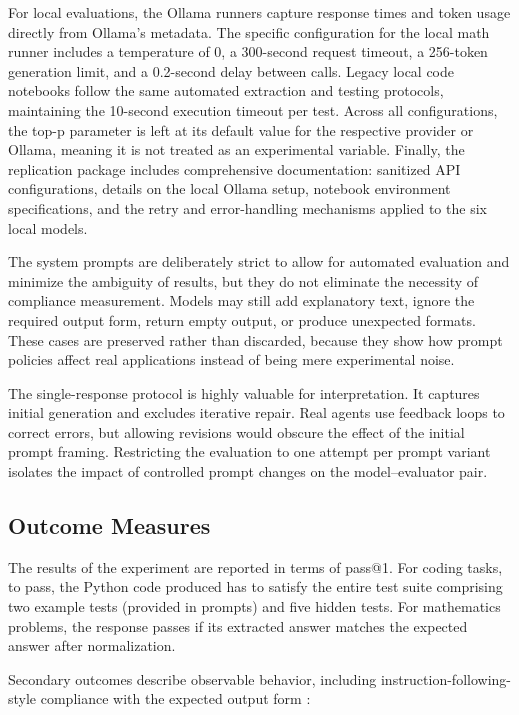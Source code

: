 \documentclass{llncs}
\begin{document}
For local evaluations, the Ollama runners capture response times and token usage directly from Ollama's metadata. The specific configuration for the local math runner includes a temperature of 0, a 300-second request timeout, a 256-token generation limit, and a 0.2-second delay between calls. Legacy local code notebooks follow the same automated extraction and testing protocols, maintaining the 10-second execution timeout per test. Across all configurations, the top-p parameter is left at its default value for the respective provider or Ollama, meaning it is not treated as an experimental variable. Finally, the replication package includes comprehensive documentation: sanitized API configurations, details on the local Ollama setup, notebook environment specifications, and the retry and error-handling mechanisms applied to the six local models.

The system prompts are deliberately strict to allow for automated evaluation and minimize the ambiguity of results, but they do not eliminate the necessity of compliance measurement. Models may still add explanatory text, ignore the required output form, return empty output, or produce unexpected formats. These cases are preserved rather than discarded, because they show how prompt policies affect real applications instead of being mere experimental noise.

The single-response protocol is highly valuable for interpretation. It captures initial generation and excludes iterative repair. Real agents use feedback loops to correct errors, but allowing revisions would obscure the effect of the initial prompt framing. Restricting the evaluation to one attempt per prompt variant isolates the impact of controlled prompt changes on the model--evaluator pair.

\subsection{Outcome Measures}\label{outcome-measures}

The results of the experiment are reported in terms of pass@1. For coding tasks, to pass, the Python code produced has to satisfy the entire test suite comprising two example tests (provided in prompts) and five hidden tests. For mathematics problems, the response passes if its extracted answer matches the expected answer after normalization.

Secondary outcomes describe observable behavior, including instruction-following-style compliance with the expected output form
\citep{zhou2023ifeval}:
\end{document}
